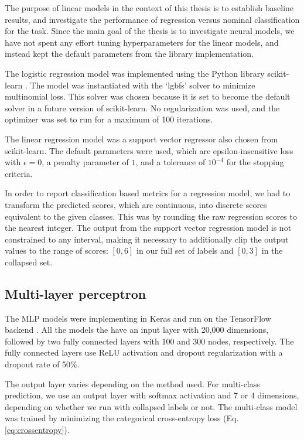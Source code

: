 The purpose of linear models in the context of this thesis is to establish
baseline results, and investigate the performance of regression versus
nominal classification for the task. Since the main goal of the thesis is to
investigate neural models, we have not spent any effort tuning
hyperparameters for the linear models, and instead kept the default
parameters from the library implementation.

The logistic regression model was implemented using the Python library
scikit-learn \autocite{scikit-learn}. The model was instantiated with the
`lgbfs' solver to minimize multinomial loss. This solver was chosen because
it is set to become the default solver in a future version of scikit-learn.
No regularization was used, and the optimizer was set to run for a maximum of
100 iterations.

The linear regression model was a support vector regressor also chosen from
scikit-learn. The default parameters were used, which are epsilon-insensitive
loss with $\epsilon=0$, a penalty parameter of $1$, and a tolerance of
$10^{-4}$ for the stopping criteria.

In order to report classification based metrics for a regression model, we
had to transform the predicted scores, which are continuous, into discrete
scores equivalent to the given classes. This was by rounding the raw
regression scores to the nearest integer. The output from the support vector
regression model is not constrained to any interval, making it necessary to
additionally clip the output values to the range of scores: $[0,6]$ in our
full set of labels and $[0,3]$ in the collapsed set.


\subsection{Multi-layer perceptron} \label{subsec:mlp}

The MLP models were implementing in Keras \autocite{keras} and run on the
TensorFlow backend \autocite{tensorflow}. All the models the have an input
layer with 20,000 dimensions, followed by two fully connected layers with 100
and 300 nodes, respectively. The fully connected layers use \ac{ReLU}
activation and dropout regularization with a dropout rate of 50\%.

The output layer varies depending on the method used. For multi-class
prediction, we use an output layer with softmax activation and 7 or 4
dimensions, depending on whether we run with collapsed labels or not. The
multi-class model was trained by minimizing the categorical cross-entropy
loss (Eq. \ref{eq:crossentropy}).

